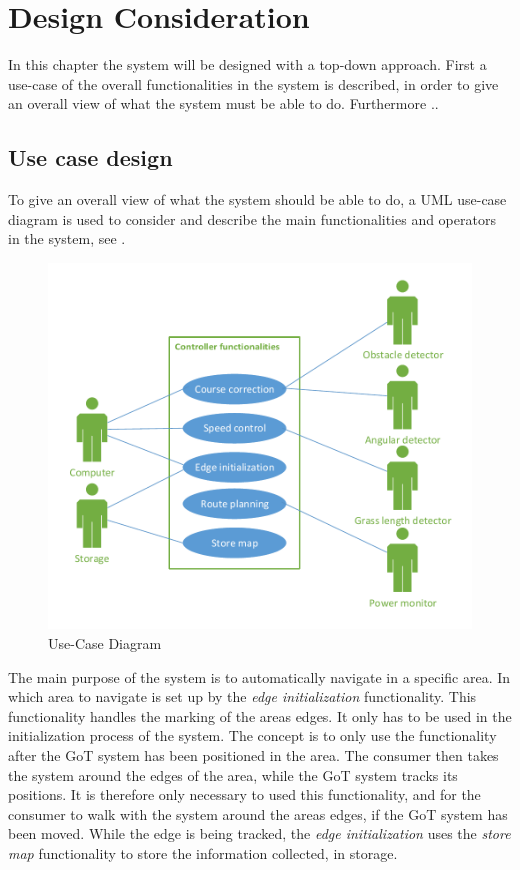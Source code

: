 \chapter{Design Consideration}
In this chapter the system will be designed with a top-down approach. First a use-case of the overall functionalities in the system is described, in order to give an overall view of what the system must be able to do. Furthermore ..  

\section{Use case design}
To give an overall view of what the system should be able to do, a UML use-case diagram is used to consider and describe the main functionalities and operators in the system, see .

 \begin{figure}[H]
	\centering
	\includegraphics[scale=0.9]{figures/P5UseCase.pdf}
	\caption{Use-Case Diagram}
	\label{fig:usecase}
	\flushleft
\end{figure}

\noindent
The main purpose of the system is to automatically navigate in a specific area. In which area to navigate is set up by the \textit{edge initialization} functionality. This functionality handles the marking of the areas edges. It only has to be used in the initialization process of the system. The concept is to only use the functionality after the GoT system has been positioned in the area. The consumer then takes the system around the edges of the area, while the GoT system tracks its positions. It is therefore only necessary to used this functionality, and for the consumer to walk with the system around the areas edges, if the GoT system has been moved. While the edge is being tracked, the \textit{edge initialization} uses the \textit{store map} functionality to store the information collected, in storage. \\\\ 

